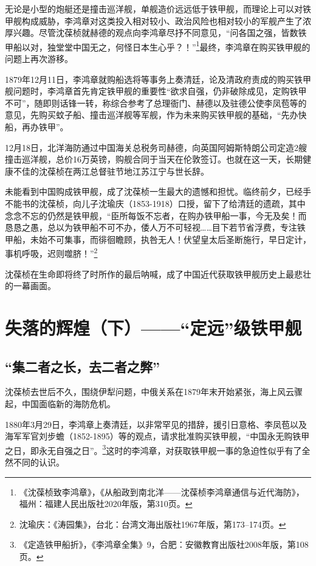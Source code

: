 \documentclass[12pt,UTF8]{ctexbook}
\begin{document}
无论是小型的炮艇还是撞击巡洋舰，单舰造价远远低于铁甲舰，而理论上可以对铁甲舰构成威胁，李鸿章对这类投入相对较小、政治风险也相对较小的军舰产生了浓厚兴趣。尽管沈葆桢就赫德的观点向李鸿章尽抒不同意见，“问各国之强，皆数铁甲船以对，独堂堂中国无之，何怪日本生心乎？！”\footnote{《沈葆桢致李鸿章》，《从船政到南北洋——沈葆桢李鸿章通信与近代海防》，福州：福建人民出版社2020年版，第310页。}最终，李鸿章在购买铁甲舰的问题上再次游移。

1879年12月11日，李鸿章就购船选将等事务上奏清廷，论及清政府责成的购买铁甲舰问题时，李鸿章首先肯定铁甲舰的重要性“欲求自强，仍非破除成见，定购铁甲不可”，随即则话锋一转，称综合参考了总理衙门、赫德以及驻德公使李凤苞等的意见，先购买蚊子船、撞击巡洋舰等军舰，作为未来购买铁甲舰的基础，“先办快船，再办铁甲”。

12月18日，北洋海防通过中国海关总税务司赫德，向英国阿姆斯特朗公司定造2艘撞击巡洋舰，总价16万英镑，购舰合同于当天在伦敦签订。也就在这一天，长期健康不佳的沈葆桢在两江总督驻节地江苏江宁与世长辞。

未能看到中国购成铁甲舰，成了沈葆桢一生最大的遗憾和担忧。临终前夕，已经手不能书的沈葆桢，向儿子沈瑜庆（1853-1918）口授，留下了给清廷的遗疏，其中念念不忘的仍然是铁甲舰，“臣所每饭不忘者，在购办铁甲船一事，今无及矣！而恳恳之愚，总以为铁甲船不可不办，倭人万不可轻视……目下若节省浮费，专注铁甲船，未始不可集事，而徘徊瞻顾，执咎无人！伏望皇太后圣断施行，早日定计，事机呼吸，迟则噬脐！”\footnote{沈瑜庆：《涛园集》，台北：台湾文海出版社1967年版，第173--174页。}

沈葆桢在生命即将终了时所作的最后呐喊，成了中国近代获取铁甲舰历史上最悲壮的一幕画面。

\chapter{失落的辉煌（下）——“定远”级铁甲舰}

\section{“集二者之长，去二者之弊”}

沈葆桢去世后不久，围绕伊犁问题，中俄关系在1879年末开始紧张，海上风云骤起，中国面临新的海防危机。

1880年3月29日，李鸿章上奏清廷，以非常罕见的措辞，援引日意格、李凤苞以及海军军官刘步蟾（1852-1895）等的观点，请求批准购买铁甲舰，“中国永无购铁甲之日，即永无自强之日”。\footnote{《定造铁甲船折》，《李鸿章全集》9，合肥：安徽教育出版社2008年版，第108页。}这时的李鸿章，对获取铁甲舰一事的急迫性似乎有了全然不同的认识。
\end{document}
